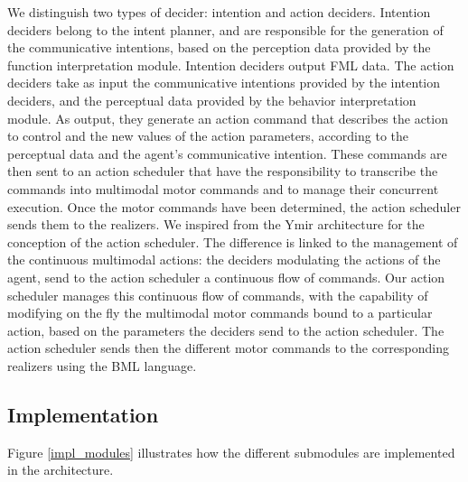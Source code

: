 We distinguish two types of decider: intention and action deciders. 
Intention deciders belong to the intent planner, and are responsible for the generation of the communicative intentions, based on the perception data provided by the function interpretation module. Intention deciders output FML data. 
The action deciders take as input the communicative intentions provided by the intention deciders, and the perceptual data provided by the behavior interpretation module. As output, they generate an action command that describes the action to control and the new values of the action parameters, according to the perceptual data and the agent's communicative intention. 
These commands are then sent to an action scheduler that have the responsibility to transcribe the commands into multimodal motor commands and to manage their concurrent execution. Once the motor commands have been determined, the action scheduler sends them to the realizers. 
We inspired from the Ymir architecture for the conception of the action scheduler. The difference is linked to the management of the continuous multimodal actions: the deciders modulating the actions of the agent, send to the action scheduler a continuous flow of commands. Our action scheduler manages this continuous flow of commands, with the capability of modifying on the fly the multimodal motor commands bound to a particular action, based on the parameters the deciders send to the action scheduler. 
The action scheduler sends then the different motor commands to the corresponding realizers using the BML language. 

\subsection{Implementation}


Figure \ref{impl_modules} illustrates how the different submodules are implemented in the architecture. 

